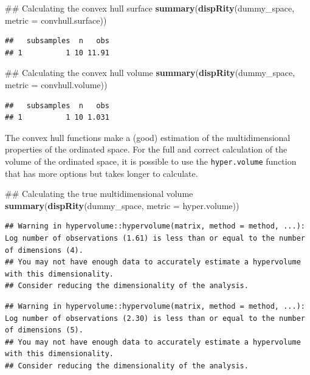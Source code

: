\documentclass[]{book}
\newenvironment{Shaded}{\begin{snugshade}}{\end{snugshade}}
\newcommand{\KeywordTok}[1]{\textcolor[rgb]{0.13,0.29,0.53}{\textbf{#1}}}
\newcommand{\DataTypeTok}[1]{\textcolor[rgb]{0.13,0.29,0.53}{#1}}
\newcommand{\NormalTok}[1]{#1}
\theoremstyle{definition}
\theoremstyle{definition}
\theoremstyle{remark}
\begin{document}
\begin{Shaded}
\begin{Highlighting}[]
\NormalTok{## Calculating the convex hull surface}
\KeywordTok{summary}\NormalTok{(}\KeywordTok{dispRity}\NormalTok{(dummy_space, }\DataTypeTok{metric =}\NormalTok{ convhull.surface))}
\end{Highlighting}
\end{Shaded}

\begin{verbatim}
##   subsamples  n   obs
## 1          1 10 11.91
\end{verbatim}

\begin{Shaded}
\begin{Highlighting}[]
\NormalTok{## Calculating the convex hull volume}
\KeywordTok{summary}\NormalTok{(}\KeywordTok{dispRity}\NormalTok{(dummy_space, }\DataTypeTok{metric =}\NormalTok{ convhull.volume))}
\end{Highlighting}
\end{Shaded}

\begin{verbatim}
##   subsamples  n   obs
## 1          1 10 1.031
\end{verbatim}

The convex hull functions make a (good) estimation of the
multidimensional properties of the ordinated space. For the full and
correct calculation of the volume of the ordinated space, it is possible
to use the \texttt{hyper.volume} function that has more options but
takes longer to calculate.

\begin{Shaded}
\begin{Highlighting}[]
\NormalTok{## Calculating the true multidimensional volume}
\KeywordTok{summary}\NormalTok{(}\KeywordTok{dispRity}\NormalTok{(dummy_space, }\DataTypeTok{metric =}\NormalTok{ hyper.volume))}
\end{Highlighting}
\end{Shaded}

\begin{verbatim}
## Warning in hypervolume::hypervolume(matrix, method = method, ...): Log number of observations (1.61) is less than or equal to the number of dimensions (4).
## You may not have enough data to accurately estimate a hypervolume with this dimensionality.
## Consider reducing the dimensionality of the analysis.
\end{verbatim}

\begin{verbatim}
## Warning in hypervolume::hypervolume(matrix, method = method, ...): Log number of observations (2.30) is less than or equal to the number of dimensions (5).
## You may not have enough data to accurately estimate a hypervolume with this dimensionality.
## Consider reducing the dimensionality of the analysis.
\end{verbatim}
\end{document}
